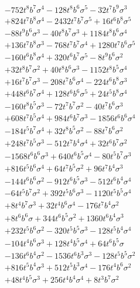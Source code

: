 {\begin{align*}
&-752t^{8}b^{7}\sigma^{4}-128t^{8}b^{6}\sigma^{5}-32t^{7}b^{9}\sigma^{3}\\
&+824t^{7}b^{8}\sigma^{4}-2432t^{7}b^{7}\sigma^{5}+16t^{6}b^{8}\sigma^{5}\\
&-88t^{9}b^{6}\sigma^{3}-40t^{8}b^{7}\sigma^{3}+1184t^{8}b^{6}\sigma^{4}\\
&+136t^{7}b^{8}\sigma^{3}-768t^{7}b^{7}\sigma^{4}+1280t^{7}b^{6}\sigma^{5}\\
&-160t^{6}b^{8}\sigma^{4}+320t^{6}b^{7}\sigma^{5}-8t^{9}b^{6}\sigma^{2}\\
&+32t^{8}b^{7}\sigma^{2}+40t^{8}b^{6}\sigma^{3}-1152t^{8}b^{5}\sigma^{4}\\
&+16t^{7}b^{7}\sigma^{3}-208t^{7}b^{6}\sigma^{4}-224t^{6}b^{8}\sigma^{3}\\
&+448t^{6}b^{7}\sigma^{4}+128t^{6}b^{6}\sigma^{5}+24t^{5}b^{8}\sigma^{4}\\
&-160t^{8}b^{5}\sigma^{3}-72t^{7}b^{7}\sigma^{2}-40t^{7}b^{6}\sigma^{3}\\
&+608t^{7}b^{5}\sigma^{4}+984t^{6}b^{7}\sigma^{3}-1856t^{6}b^{6}\sigma^{4}\\
&-184t^{5}b^{7}\sigma^{4}+32t^{8}b^{5}\sigma^{2}-88t^{7}b^{6}\sigma^{2}\\
&+248t^{7}b^{5}\sigma^{3}-512t^{7}b^{4}\sigma^{4}+32t^{6}b^{7}\sigma^{2}\\
&-1568t^{6}b^{6}\sigma^{3}+640t^{6}b^{5}\sigma^{4}-80t^{5}b^{7}\sigma^{3}\\
&+816t^{5}b^{6}\sigma^{4}+64t^{7}b^{5}\sigma^{2}+96t^{7}b^{4}\sigma^{3}\\
&-144t^{6}b^{6}\sigma^{2}-912t^{6}b^{5}\sigma^{3}-512t^{6}b^{4}\sigma^{4}\\
&-64t^{5}b^{7}\sigma^{2}+392t^{5}b^{6}\sigma^{3}-1120t^{5}b^{5}\sigma^{4}\\
&+8t^{4}b^{7}\sigma^{3}+32t^{4}b^{6}\sigma^{4}-176t^{7}b^{4}\sigma^{2}\\
&+8t^{6}b^{6}\sigma+344t^{6}b^{5}\sigma^{2}+1360t^{6}b^{4}\sigma^{3}\\
&+232t^{5}b^{6}\sigma^{2}-320t^{5}b^{5}\sigma^{3}-128t^{5}b^{4}\sigma^{4}\\
&-104t^{4}b^{6}\sigma^{3}+128t^{4}b^{5}\sigma^{4}+64t^{6}b^{5}\sigma\\
&-136t^{6}b^{4}\sigma^{2}-1536t^{6}b^{3}\sigma^{3}-128t^{5}b^{5}\sigma^{2}\\
&+816t^{5}b^{4}\sigma^{3}+512t^{5}b^{3}\sigma^{4}-176t^{4}b^{6}\sigma^{2}\\
&+48t^{4}b^{5}\sigma^{3}+256t^{4}b^{4}\sigma^{4}+8t^{3}b^{7}\sigma^{2}\\

\end{align*}}
